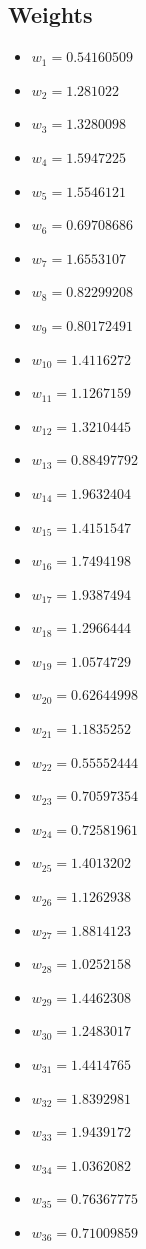 \documentclass[11pt]{article}
\begin{document}
\subsection*{Weights}
\begin{itemize}
\item $w_{1} = 0.54160509$
\item $w_{2} = 1.281022$
\item $w_{3} = 1.3280098$
\item $w_{4} = 1.5947225$
\item $w_{5} = 1.5546121$
\item $w_{6} = 0.69708686$
\item $w_{7} = 1.6553107$
\item $w_{8} = 0.82299208$
\item $w_{9} = 0.80172491$
\item $w_{10} = 1.4116272$
\item $w_{11} = 1.1267159$
\item $w_{12} = 1.3210445$
\item $w_{13} = 0.88497792$
\item $w_{14} = 1.9632404$
\item $w_{15} = 1.4151547$
\item $w_{16} = 1.7494198$
\item $w_{17} = 1.9387494$
\item $w_{18} = 1.2966444$
\item $w_{19} = 1.0574729$
\item $w_{20} = 0.62644998$
\item $w_{21} = 1.1835252$
\item $w_{22} = 0.55552444$
\item $w_{23} = 0.70597354$
\item $w_{24} = 0.72581961$
\item $w_{25} = 1.4013202$
\item $w_{26} = 1.1262938$
\item $w_{27} = 1.8814123$
\item $w_{28} = 1.0252158$
\item $w_{29} = 1.4462308$
\item $w_{30} = 1.2483017$
\item $w_{31} = 1.4414765$
\item $w_{32} = 1.8392981$
\item $w_{33} = 1.9439172$
\item $w_{34} = 1.0362082$
\item $w_{35} = 0.76367775$
\item $w_{36} = 0.71009859$

\end{itemize}
\end{document}
